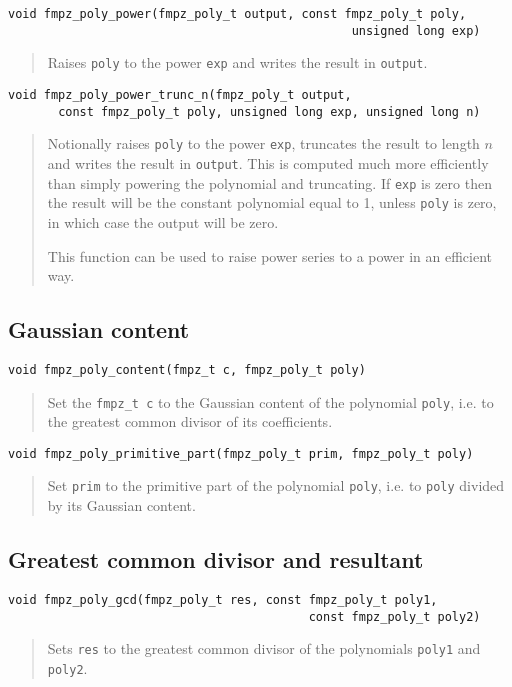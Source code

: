 \documentclass[a4paper,10pt]{article}
\newcommand{\code}{\lstinline}
\begin{document}
\begin{lstlisting}
void fmpz_poly_power(fmpz_poly_t output, const fmpz_poly_t poly, 
                                                unsigned long exp) 
\end{lstlisting}
\begin{quote}
Raises \code{poly} to the power \code{exp} and writes the result in \code{output}.
\end{quote}

\begin{lstlisting}
void fmpz_poly_power_trunc_n(fmpz_poly_t output, 
       const fmpz_poly_t poly, unsigned long exp, unsigned long n) 
\end{lstlisting}
\begin{quote}
Notionally raises \code{poly} to the power \code{exp}, truncates the result to length $n$ and writes the result in \code{output}. This is computed much more efficiently than simply powering the polynomial and truncating. If \code{exp} is zero then the result will be the constant polynomial equal to 1, unless \code{poly} is zero, in which case the output will be zero.

This function can be used to raise power series to a power in an efficient way.
\end{quote}

\subsection{Gaussian content}

\begin{lstlisting}
void fmpz_poly_content(fmpz_t c, fmpz_poly_t poly)
\end{lstlisting}
\begin{quote}
Set the \code{fmpz_t c} to the Gaussian content of the polynomial \code{poly}, i.e. to the greatest common divisor of its coefficients.
\end{quote}

\begin{lstlisting}
void fmpz_poly_primitive_part(fmpz_poly_t prim, fmpz_poly_t poly)
\end{lstlisting}
\begin{quote}
Set \code{prim} to the primitive part of the polynomial \code{poly}, i.e. to \code{poly} divided by its Gaussian content.
\end{quote}

\subsection{Greatest common divisor and resultant}
\begin{lstlisting}
void fmpz_poly_gcd(fmpz_poly_t res, const fmpz_poly_t poly1, 
                                          const fmpz_poly_t poly2)
\end{lstlisting}
\begin{quote}
Sets \code{res} to the greatest common divisor of the polynomials \code{poly1} and \code{poly2}.
\end{quote}
\end{document}
